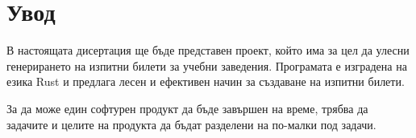\section{Увод}

В настоящата дисертация ще бъде представен проект, който има за цел да улесни
генерирането на изпитни билети за учебни заведения. Програмата е изградена на
езика Rust и предлага лесен и ефективен начин за създаване на изпитни билети.

За да може един софтурен продукт да бъде завършен на време, трябва да задачите
и целите на продукта да бъдат разделени на по-малки под задачи.
%
% 
% 
% 
% 


%

